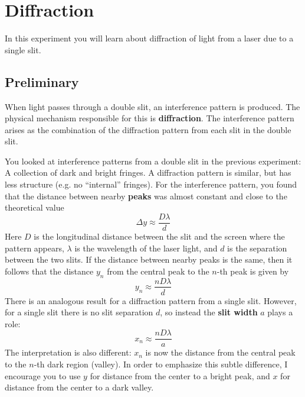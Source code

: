 \setcounter{chapter}{10}
\chapter{Diffraction}
In this experiment you will learn about diffraction of light from a laser due to a single slit.
\section{Preliminary}
When light passes through a double slit, an interference pattern is produced. The physical mechanism responsible for this is \textbf{diffraction}. The interference pattern arises as the combination of the diffraction pattern from each slit in the double slit.

You looked at interference patterns from a double slit in the previous experiment: A collection of dark and bright fringes. A diffraction pattern is similar, but has less structure (e.g. no ``internal'' fringes). For the interference pattern, you found that the distance between nearby \textbf{peaks} was almost constant and close to the theoretical value
\begin{equation}
    \Delta y \approx \frac{D \lambda}{d}
\end{equation}
Here $D$ is the longitudinal distance between the slit and the screen where the pattern appears, $\lambda$ is the wavelength of the laser light, and $d$ is the separation between the two slits. If the distance between nearby peaks is the same, then it follows that the distance $y_{n}$ from the central peak to the $n$-th peak is given by
\begin{equation}
    y_{n} \approx \frac{n D \lambda}{d}
\end{equation}
There is an analogous result for a diffraction pattern from a single slit. However, for a single slit there is no slit separation $d$, so instead the \textbf{slit width} $a$ plays a role:
\begin{equation}
    x_{n} \approx \frac{n D \lambda}{a}
\end{equation}
The interpretation is also different: $x_{n}$ is now the distance from the central peak to the $n$-th dark region (valley). In order to emphasize this subtle difference, I encourage you to use $y$ for distance from the center to a bright peak, and $x$ for distance from the center to a dark valley.
